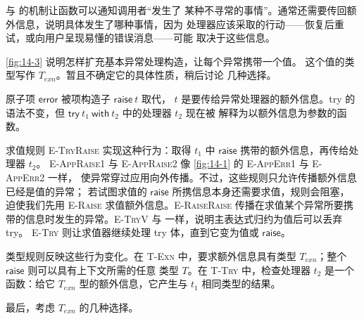  与  的机制让函数可以通知调用者“发生了
某种不寻常的事情”。通常还需要传回额外信息，说明具体发生了哪种事情，因为
处理器应该采取的行动——恢复后重试，或向用户呈现易懂的错误消息——可能
取决于这些信息。

\cref{fig:14-3} 说明怎样扩充基本异常处理构造，让每个异常携带一个值。
这个值的类型写作 \(T_{\mathit{exn}}\)。暂且不确定它的具体性质，稍后讨论
几种选择。

原子项 \(\mathsf{error}\) 被项构造子 \(\mathsf{raise}\ t\) 取代，
\(t\) 是要传给异常处理器的额外信息。try 的语法不变，但
\(\mathsf{try}\ t_1\ \mathsf{with}\ t_2\) 中的处理器 \(t_2\) 现在被
解释为以额外信息为参数的函数。

求值规则 \textsc{E-TryRaise} 实现这种行为：取得 \(t_1\) 中
\(\mathsf{raise}\) 携带的额外信息，再传给处理器 \(t_2\)。
\textsc{E-AppRaise1} 与 \textsc{E-AppRaise2} 像
\cref{fig:14-1} 的 \textsc{E-AppErr1} 与 \textsc{E-AppErr2} 一样，
使异常穿过应用向外传播。不过，这些规则只允许传播额外信息已经是值的异常；
若试图求值的 \(\mathsf{raise}\) 所携信息本身还需要求值，规则会阻塞，
迫使我们先用 \textsc{E-Raise} 求值额外信息。\textsc{E-RaiseRaise}
传播在求值某个异常所要携带的信息时发生的异常。\textsc{E-TryV} 与
 一样，说明主表达式归约为值后可以丢弃 try。
\textsc{E-Try} 则让求值器继续处理 try 体，直到它变为值或
\(\mathsf{raise}\)。

类型规则反映这些行为变化。在 \textsc{T-Exn} 中，要求额外信息具有类型
\(T_{\mathit{exn}}\)；整个 \(\mathsf{raise}\) 则可以具有上下文所需的任意
类型 \(T\)。在 \textsc{T-Try} 中，检查处理器 \(t_2\) 是一个函数：给它
\(T_{\mathit{exn}}\) 型的额外信息，它产生与 \(t_1\) 相同类型的结果。

最后，考虑 \(T_{\mathit{exn}}\) 的几种选择。


